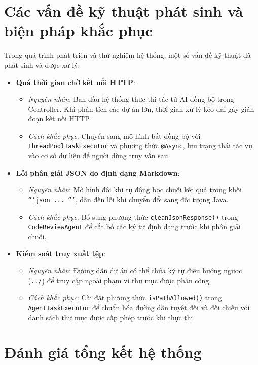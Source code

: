 \documentclass[12pt,a4paper]{report}
\begin{document}
\section{Các vấn đề kỹ thuật phát sinh và biện pháp khắc phục}
Trong quá trình phát triển và thử nghiệm hệ thống, một số vấn đề kỹ thuật đã phát sinh và được xử lý:
\begin{itemize}
    \item \textbf{Quá thời gian chờ kết nối HTTP}:
    \begin{itemize}
        \item \textit{Nguyên nhân}: Ban đầu hệ thống thực thi tác tử AI đồng bộ trong Controller. Khi phân tích các dự án lớn, thời gian xử lý kéo dài gây gián đoạn kết nối HTTP.
        \item \textit{Cách khắc phục}: Chuyển sang mô hình bất đồng bộ với \texttt{ThreadPoolTaskExecutor} và phương thức \texttt{@Async}, lưu trạng thái tác vụ vào cơ sở dữ liệu để người dùng truy vấn sau.
    \end{itemize}
    \item \textbf{Lỗi phân giải JSON do định dạng Markdown}:
    \begin{itemize}
        \item \textit{Nguyên nhân}: Mô hình đôi khi tự động bọc chuỗi kết quả trong khối \texttt{```json ... ```}, dẫn đến lỗi khi chuyển đổi sang đối tượng Java.
        \item \textit{Cách khắc phục}: Bổ sung phương thức \texttt{cleanJsonResponse()} trong \texttt{CodeReviewAgent} để cắt bỏ các ký tự định dạng trước khi phân giải chuỗi.
    \end{itemize}
    \item \textbf{Kiểm soát truy xuất tệp}:
    \begin{itemize}
        \item \textit{Nguyên nhân}: Đường dẫn dự án có thể chứa ký tự điều hướng ngược (\texttt{../}) để truy cập ngoài phạm vi thư mục được phân công.
        \item \textit{Cách khắc phục}: Cài đặt phương thức \texttt{isPathAllowed()} trong \texttt{AgentTaskExecutor} để chuẩn hóa đường dẫn tuyệt đối và đối chiếu với danh sách thư mục được cấp phép trước khi thực thi.
    \end{itemize}
\end{itemize}

\section{Đánh giá tổng kết hệ thống}
\end{document}
